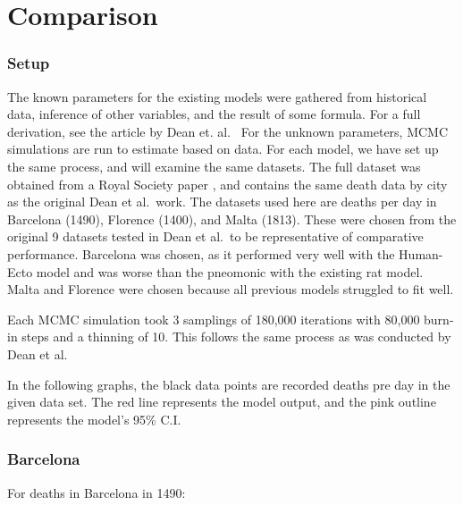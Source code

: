 \documentclass [letterpaper, 12pt] {article}
\begin{document}
\newpage

\section {Comparison}

\subsubsection{Setup}

The known parameters for the existing models were gathered from historical data, inference of other variables, and the result of some formula. For a full derivation, see the article by Dean et. al.\ \cite{Dean1304}
For the unknown parameters, MCMC simulations are run to estimate based on data. For each model, we have set up the same process, and will examine the same datasets.
The full dataset was obtained from a Royal Society paper \cite{Sun_Xu_et_al_2019_dataset}, and contains the same death data by city as the original Dean et al.\ work. The datasets used here are deaths per day in Barcelona (1490), Florence (1400), and Malta (1813). These were chosen from the original 9 datasets tested in Dean et al.\ to be representative of comparative performance. Barcelona was chosen, as it performed very well with the Human-Ecto model and was worse than the pneomonic with the existing rat model. Malta and Florence were chosen because all previous models struggled to fit well.

Each MCMC simulation took 3 samplings of 180,000 iterations with 80,000 burn-in steps and a thinning of 10. This follows the same process as was conducted by Dean et al.

In the following graphs, the black data points are recorded deaths pre day in the given data set. The red line represents the model output, and the pink outline represents the model's 95\% C.I.

\newpage

\subsubsection{Barcelona}
For deaths in Barcelona in 1490:
\end{document}
